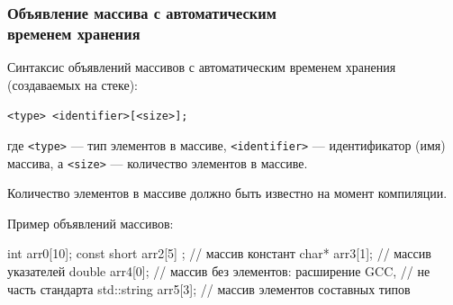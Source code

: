 \documentclass[compress, 8pt, aspectratio=169]{beamer}
\begin{document}
\begin{frame}[fragile]

    \frametitle{Объявление массива с автоматическим \\ временем хранения}

    Синтаксис объявлений массивов с автоматическим временем хранения
    (создаваемых на стеке):

    \begin{center}

        \verb|<type> <identifier>[<size>];|

    \end{center}

    где \verb|<type>| --- тип элементов в массиве, \verb|<identifier>| --- идентификатор
    (имя) массива, а \verb|<size>| --- количество элементов в массиве.

    \hfill \break
    Количество элементов в массиве должно быть известно на момент компиляции\footnotemark{}.


    \hfill \break
    Пример объявлений массивов:

    \begin{center}

        \begin{myinplacelisting}[minted language=cpp]
int arr0[10];
const short arr2[5] {};  // массив констант
char* arr3[1];           // массив указателей
double arr4[0];          // массив без элементов: расширение GCC,
                         // не часть стандарта
std::string arr5[3];     // массив элементов составных типов
        \end{myinplacelisting}
    \end{center}

\end{frame}
\end{document}

